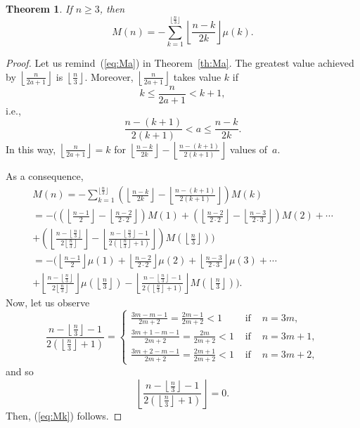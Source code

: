 \documentclass[10pt]{amsart}
\newtheorem{theor}{Theorem}
\begin{document}
\begin{theor}
\label{th:Mk}
If $n\geq 3$, then
\begin{equation}
\label{eq:Mk}
M(n) = -\sum_{k=1}^{\lfloor\frac{n}3\rfloor}
\left\lfloor \frac{n-k}{2k}\right\rfloor \mu(k).
\end{equation}
\end{theor}

\begin{proof}
Let us remind~(\ref{eq:Ma}) in Theorem~\ref{th:Ma}.
The greatest value achieved by $\left\lfloor \frac{n}{2a+1} \right\rfloor$ is
$\left\lfloor \frac{n}{3} \right\rfloor$. Moreover, 
$\left\lfloor \frac{n}{2a+1} \right\rfloor$ takes value $k$ if
$$
k \leq \frac{n}{2a+1} < k+1,
$$
i.e.,
$$
\frac{n-(k+1)}{2(k+1)} < a \leq \frac {n-k}{2k}.
$$
In this way, $\left\lfloor \frac{n}{2a+1}\right\rfloor = k$ for
$\left\lfloor \frac{n-k}{2k}\right\rfloor
- \left\lfloor \frac{n-(k+1)}{2(k+1)}\right\rfloor$ values
of~$a$.

As a consequence,
\begin{multline*}
M(n) = -\sum_{k=1}^{\lfloor\frac{n}3\rfloor}
\left( \left\lfloor \frac{n-k}{2k}\right\rfloor
- \left\lfloor \frac {n-(k+1)}{2(k+1)}\right\rfloor \right) M(k)
\\
= -\Bigg(
\left( \left\lfloor \frac{n-1}{2}\right\rfloor
- \left\lfloor \frac {n-2}{2\cdot 2}\right\rfloor \right) M(1)
+ \left( \left\lfloor \frac {n-2}{2\cdot 2}\right\rfloor
- \left\lfloor \frac {n-3}{2\cdot 3}\right\rfloor \right) M(2)
+ \cdots
\\
+ \left( \left\lfloor \frac {n-\left\lfloor \frac n3\right\rfloor}{2\left\lfloor
\frac n3\right\rfloor}\right\rfloor 
- \left\lfloor \frac {n-\left\lfloor \frac n3\right\rfloor-1}{2\left(\left\lfloor
\frac n3\right\rfloor+1\right)}\right\rfloor\right)
M\left(\left\lfloor \frac n3\right\rfloor\right)
\Bigg)
\\
= -\Bigg(
\left\lfloor \frac {n-1}{2}\right\rfloor \mu(1)
+ \left\lfloor \frac {n-2}{2\cdot 2}\right\rfloor \mu(2)
+ \left\lfloor \frac {n-3}{2\cdot 3}\right\rfloor \mu(3)
+ \cdots
\\
+ \left\lfloor \frac {n-\left\lfloor \frac n3\right\rfloor}{2\left\lfloor
\frac n3\right\rfloor}\right\rfloor
\mu\left(\left\lfloor \frac n3\right\rfloor\right)
- \left\lfloor \frac {n-\left\lfloor \frac n3\right\rfloor-1}{2\left(\left\lfloor
\frac n3\right\rfloor+1\right)}\right\rfloor
M\left(\left\lfloor \frac n3\right\rfloor\right)
\Bigg).
\end{multline*}
Now, let us observe
$$
\frac {n-\left\lfloor \frac n3\right\rfloor-1}{2\left(\left\lfloor
\frac n3\right\rfloor+1\right)}
= \left\{ \begin{array}{lll}
\frac{3m-m-1}{2m+2} = \frac{2m-1}{2m+2} < 1 & \mbox{ if } & n=3m ,\\[1mm]
\frac{3m+1-m-1}{2m+2} = \frac{2m}{2m+2} < 1  & \mbox{ if } & n=3m+1,\\[1mm]
\frac{3m+2-m-1}{2m+2} = \frac{2m+1}{2m+2} < 1 & \mbox{ if } & n=3m+2,
\end{array}
\right.
$$
and so
$$
\left\lfloor \frac {n-\left\lfloor \frac n3\right\rfloor-1}{2\left(\left\lfloor
\frac n3\right\rfloor+1\right)}\right\rfloor = 0.
$$
Then, (\ref{eq:Mk}) follows.
\end{proof}
\end{document}
